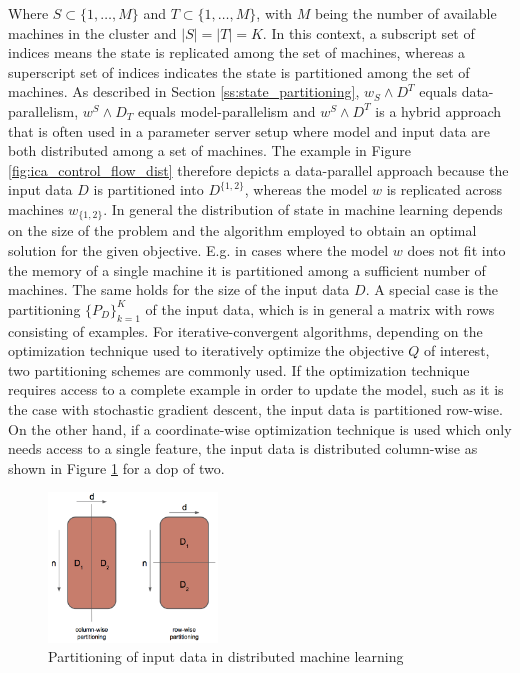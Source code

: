 Where $S \subset \{1, \ldots, M\}$ and $T \subset \{1, \ldots, M\}$, with $M$ being the number of available machines in the cluster and $\mid S \mid = \mid T \mid = K$.
In this context, a subscript set of indices means the state is replicated among the set of machines, whereas a superscript set of indices indicates the state is partitioned among the set of machines.
As described in Section \ref{ss:state_partitioning}, $w_S \wedge D^T$ equals data-parallelism, $w^S \wedge D_T$ equals model-parallelism and $w^S \wedge D^T$ is a hybrid approach that is often used in a parameter server setup where model and input data are both distributed among a set of machines.
The example in Figure \ref{fig:ica_control_flow_dist} therefore depicts a data-parallel approach because the input data $D$ is partitioned into $D^{\{1,2\}}$, whereas the model $w$ is replicated across machines $w_{\{1,2\}}$.
In general the distribution of state in machine learning depends on the size of the problem and the algorithm employed to obtain an optimal solution for the given objective.
E.g. in cases where the model $w$ does not fit into the memory of a single machine it is partitioned among a sufficient number of machines.
The same holds for the size of the input data $D$.
A special case is the partitioning $\{P_D\}_{k=1}^K$ of the input data, which is in general a matrix with rows consisting of examples.
For iterative-convergent algorithms, depending on the optimization technique used to iteratively optimize the objective $Q$ of interest, two partitioning schemes are commonly used.
If the optimization technique requires access to a complete example in order to update the model, such as it is the case with stochastic gradient descent, the input data is partitioned row-wise.
On the other hand, if a coordinate-wise optimization technique is used which only needs access to a single feature, the input data is distributed column-wise as shown in Figure \ref{fig:row_col_dist} for a dop of two.
\begin{figure}[ht]
\centering
\includegraphics[width=0.4\textwidth]{img/row_col_dist.png}
\caption{Partitioning of input data in distributed machine learning}
\label{fig:row_col_dist}
\end{figure}


